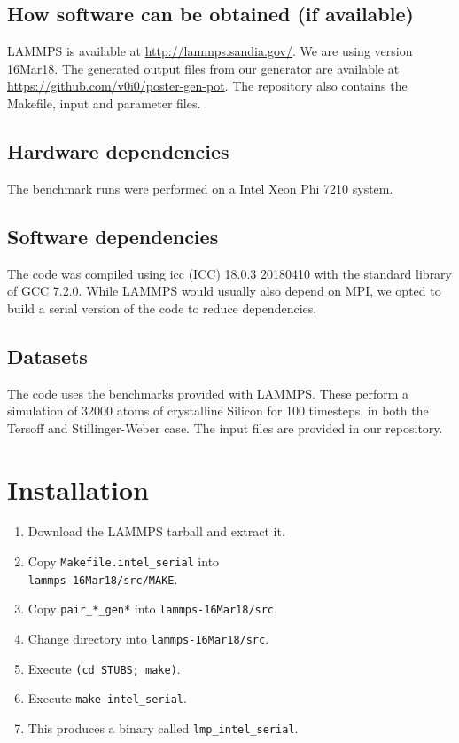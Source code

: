 \documentclass[sigconf]{acmart}
\begin{document}
\subsection{How software can be obtained (if available)}

LAMMPS is available at \url{http://lammps.sandia.gov/}. We are using version 16Mar18.
The generated output files from our generator are available at \url{https://github.com/v0i0/poster-gen-pot}.
The repository also contains the Makefile, input and parameter files.

\subsection{Hardware dependencies}

The benchmark runs were performed on a Intel Xeon Phi 7210 system.

\subsection{Software dependencies}

The code was compiled using icc (ICC) 18.0.3 20180410 with the standard library of GCC 7.2.0.
While LAMMPS would usually also depend on MPI, we opted to build a serial version of the code to reduce dependencies.

\subsection{Datasets}

The code uses the benchmarks provided with LAMMPS.
These perform a simulation of 32000 atoms of crystalline Silicon for 100 timesteps, in both the Tersoff and Stillinger-Weber case.
The input files are provided in our repository.

\section{Installation}

\begin{enumerate}
\item Download the LAMMPS tarball and extract it.
\item Copy \verb+Makefile.intel_serial+ into\\\verb+lammps-16Mar18/src/MAKE+.
\item Copy \verb+pair_*_gen*+ into \verb+lammps-16Mar18/src+.
\item Change directory into \verb+lammps-16Mar18/src+.
\item Execute \verb+(cd STUBS; make)+.
\item Execute \verb+make intel_serial+.
\item This produces a binary called \verb+lmp_intel_serial+.
\end{enumerate}
\end{document}
